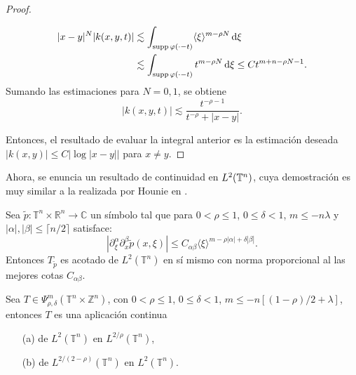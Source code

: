 \begin{proof}
\begin{itemize}
\begin{align*}
			|x-y|^N|k(x, y, t)|  & \lesssim \int_{\operatorname{supp} \varphi(\cdot - t)} \langle\xi\rangle^{m - \rho N} \mathop{}\!\mathrm{d} \xi \\
			 & \lesssim \int_{\operatorname{supp} \varphi(\cdot - t)} t^{m-\rho N}\mathop{}\!\mathrm{d}\xi \leq Ct^{m+n - \rho N-1}.
		\end{align*}
		Sumando las estimaciones para $N = 0, 1$, se obtiene 
		\begin{equation*}
			|k(x, y, t)| \lesssim \frac{t^{ -\rho - 1}}{t^{-\rho } + |x - y|}.
		\end{equation*}           
	\end{itemize} Entonces, el resultado de evaluar la integral anterior es la estimación deseada $|k(x, y)| \leq  C|\log |x-y|| $ para $x \neq y$.
\end{proof}
Ahora, se enuncia un resultado de continuidad en $L^2(\mathbb{T}^n)$, cuya demostración es muy similar a la realizada por Hounie en \cite{hounie}.
\begin{theorem}\label{theo:22boundT}
	Sea $\tilde{p}:\mathbb{T}^n \times \mathbb{R}^n \rightarrow \mathbb{C}$ un símbolo tal que para $0<\rho\leq1$, $0\leq \delta < 1$, $m\leq -n \lambda$ y $|\alpha|,|\beta| \leq \lceil n/2\rceil$ satisface: 
	\begin{equation}
		\left|\partial^\alpha_\xi \partial^\beta_x \tilde{p}(x, \xi)\right| \leq C_{\alpha\beta}\langle\xi\rangle^{m-\rho|\alpha| + \delta|\beta|}.
	\end{equation}
	Entonces $T_{\tilde{p}}$ es acotado de $L^2(\mathbb{T}^n)$ en sí mismo con  norma proporcional al las mejores cotas $C_{\alpha\beta}$.
\end{theorem}
\begin{theorem}
	Sea $T \in \Psi^m_{\rho, \delta}(\mathbb{T}^n \times \mathbb{Z}^n) $, con $0 < \rho \leq 1$, $0 \leq \delta < 1$, $m \leq - n [(1-\rho)/2 + \lambda] $, entonces $T$ es una aplicación continua
	\begin{itemize}
		\item[(a)]  de $L^2(\mathbb{T}^n)$ en $L^{2/\rho}(\mathbb{T}^n)$,
		\item[(b)] de $L^{2/(2-\rho)}(\mathbb{T}^n)$ en $L^{2}(\mathbb{T}^n)$.
	\end{itemize}
	\label{teo:cotas-L}
\end{theorem}

